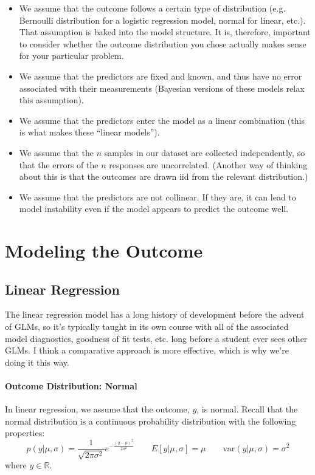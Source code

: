 \begin{itemize}
\item We assume that the outcome follows a certain type of distribution (e.g. Bernoulli distribution for a logistic regression model, normal for linear, etc.). That assumption is baked into the model structure. It is, therefore, important to consider whether the outcome distribution you chose actually makes sense for your particular problem.
\item We assume that the predictors are fixed and known, and thus have no error associated with their measurements (Bayesian versions of these models relax this assumption).
\item We assume that the predictors enter the model as a linear combination (this is what makes these ``linear models''). 
\item We assume that the $n$ samples in our dataset are collected independently, so that the errors of the $n$ responses are uncorrelated. (Another way of thinking about this is that the outcomes are drawn iid from the relevant distribution.)
\item We assume that the predictors are not collinear. If they are, it can lead to model instability even if the model appears to predict the outcome well. 
\end{itemize}


\section{Modeling the Outcome}

\subsection{Linear Regression}

The linear regression model has a long history of development before the advent of GLMs, so it's typically taught in its own course with all of the associated model diagnostics, goodness of fit tests, etc. long before a student ever sees other GLMs. I think a comparative approach is more effective, which is why we're doing it this way.

\paragraph{Outcome Distribution: Normal} In linear regression, we assume that the outcome, $y$, is normal. Recall that the normal distribution is a continuous probability distribution with the following properties:
$$ p(y | \mu, \sigma) = \frac{1}{\sqrt{2 \pi \sigma^2}} e^{-\frac{(y-\mu)^2}{2 \sigma^2}} \qquad  E[y| \mu, \sigma] = \mu \qquad \text{var}(y | \mu, \sigma) = \sigma^2 $$
where $y \in \mathbb{R}$.

